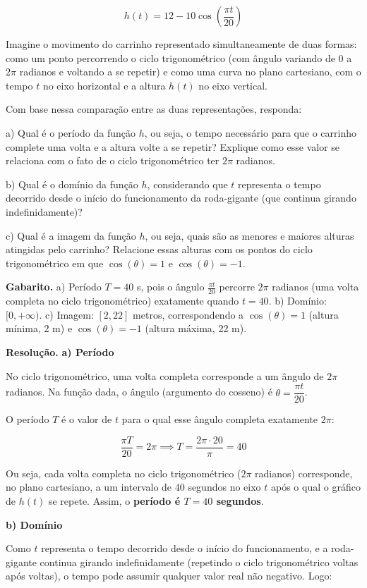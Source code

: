 \documentclass[11pt,a4paper]{article}
\begin{document}
$$h(t) = 12 - 10\cos\left(\dfrac{\pi t}{20}\right)$$

Imagine o movimento do carrinho representado simultaneamente de duas formas: como um ponto percorrendo o ciclo trigonométrico (com ângulo variando de $0$ a $2\pi$ radianos e voltando a se repetir) e como uma curva no plano cartesiano, com o tempo $t$ no eixo horizontal e a altura $h(t)$ no eixo vertical.

Com base nessa comparação entre as duas representações, responda:

a) Qual é o período da função $h$, ou seja, o tempo necessário para que o carrinho complete uma volta e a altura volte a se repetir? Explique como esse valor se relaciona com o fato de o ciclo trigonométrico ter $2\pi$ radianos.

b) Qual é o domínio da função $h$, considerando que $t$ representa o tempo decorrido desde o início do funcionamento da roda-gigante (que continua girando indefinidamente)?

c) Qual é a imagem da função $h$, ou seja, quais são as menores e maiores alturas atingidas pelo carrinho? Relacione essas alturas com os pontos do ciclo trigonométrico em que $\cos(\theta) = 1$ e $\cos(\theta) = -1$.

\textbf{Gabarito.} a) Período $T = 40$ s, pois o ângulo $\frac{\pi t}{20}$ percorre $2\pi$ radianos (uma volta completa no ciclo trigonométrico) exatamente quando $t=40$. b) Domínio: $[0,+\infty)$. c) Imagem: $[2,22]$ metros, correspondendo a $\cos(\theta)=1$ (altura mínima, 2 m) e $\cos(\theta)=-1$ (altura máxima, 22 m).

\textbf{Resolução.} \textbf{a) Período}

No ciclo trigonométrico, uma volta completa corresponde a um ângulo de $2\pi$ radianos. Na função dada, o ângulo (argumento do cosseno) é $\theta = \dfrac{\pi t}{20}$.

O período $T$ é o valor de $t$ para o qual esse ângulo completa exatamente $2\pi$:

$$\frac{\pi T}{20} = 2\pi \implies T = \frac{2\pi \cdot 20}{\pi} = 40$$

Ou seja, cada volta completa no ciclo trigonométrico ($2\pi$ radianos) corresponde, no plano cartesiano, a um intervalo de $40$ segundos no eixo $t$ após o qual o gráfico de $h(t)$ se repete. Assim, o \textbf{período é $T = 40$ segundos}.

\textbf{b) Domínio}

Como $t$ representa o tempo decorrido desde o início do funcionamento, e a roda-gigante continua girando indefinidamente (repetindo o ciclo trigonométrico voltas após voltas), o tempo pode assumir qualquer valor real não negativo. Logo:
\end{document}
